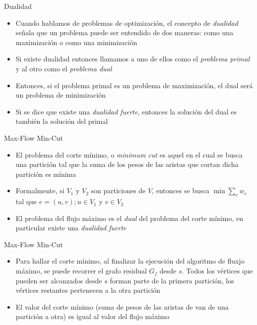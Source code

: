 \documentclass[]{beamer}
\begin{document}
\begin{frame}{Dualidad}
  \begin{itemize}
    \item Cuando hablamos de problemas de optimizaci\'on, el concepto de \textit{dualidad} se\~nala que un problema puede ser entendido de dos maneras: como una maximizaci\'on o como una minimizaci\'on
      \pause
    \item Si existe dualidad entonces llamamos a uno de ellos como el \textit{problema primal} y al otro como el \textit{problema dual}
      \pause
    \item Entonces, si el problema primal es un problema de maximizaci\'on, el dual ser\'a un problema de minimizaci\'on
      \pause
    \item Si se dice que existe una \textit{dualidad fuerte}, entonces la soluci\'on del dual es tambi\'en la soluci\'on del primal
  \end{itemize}
\end{frame}

\begin{frame}{Max-Flow Min-Cut}
  \begin{itemize}
    \item El problema del corte m\'inimo, o \textit{minimum cut} es aquel en el cual se busca una partici\'on tal que la suma de los pesos de las aristas que cortan dicha partici\'on es m\'inima
      \pause
    \item Formalmente, si $V_1$ y $V_2$ son particiones de $V$, entonces se busca $\min \sum_e w_e$ tal que $e =(u,v); u \in V_1$ y $v\in V_2$
      \pause
    \item El problema del flujo m\'aximo es el \textit{dual} del problema del corte m\'inimo, en particular existe una \textit{dualidad fuerte}
  \end{itemize}
\end{frame}

\begin{frame}{Max-Flow Min-Cut}
  \begin{itemize}
    \item Para hallar el corte m\'inimo, al finalizar la ejecuci\'on del algoritmo de fluxjo m\'aximo, se puede recorrer el grafo residual $G_f$ desde $s$. Todos los v\'ertices que pueden ser alcanzados desde $s$ forman parte de la primera partici\'on, los v\'ertices restantes pertenecen a la otra partici\'on
      \pause
    \item El valor del corte m\'inimo (suma de pesos de las aristas de van de una partici\'on a otra) es igual al valor del flujo m\'aximo
  \end{itemize}
\end{frame}
\end{document}
